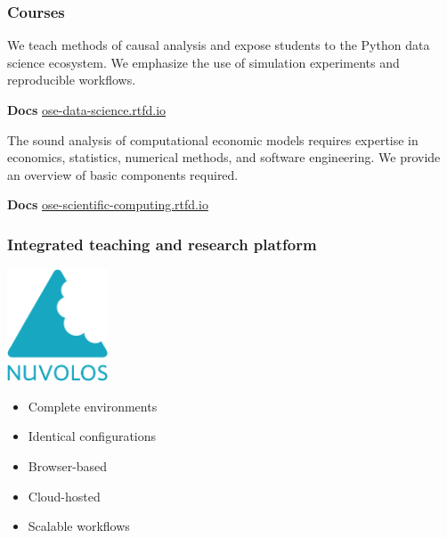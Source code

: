 \begin{frame}\frametitle{Courses}


    We teach methods of causal analysis and expose students to the Python data science ecosystem. We emphasize the use of simulation experiments and reproducible workflows.

    \textbf{Docs}\hspace{0.25cm} \url{ose-data-science.rtfd.io}\vspace{0.5cm}


    The sound analysis of computational economic models requires expertise in economics, statistics, numerical methods, and software engineering. We provide an overview of basic components required.

    \textbf{Docs}\hspace{0.25cm} \url{ose-scientific-computing.rtfd.io}

\end{frame}
\begin{frame}\frametitle{Integrated teaching and research platform}\vspace{1.25cm}

	\begin{multicols}{2}

	\hspace{1.3cm}\includegraphics[width=0.225\textwidth]{material/crop-nuvolos}


	\begin{itemize}\setlength\itemsep{1em}
		\item Complete environments
		\item Identical configurations
		\item Browser-based
		\item Cloud-hosted
		\item Scalable workflows
  \end{itemize}
  	  \end{multicols}

\end{frame}
